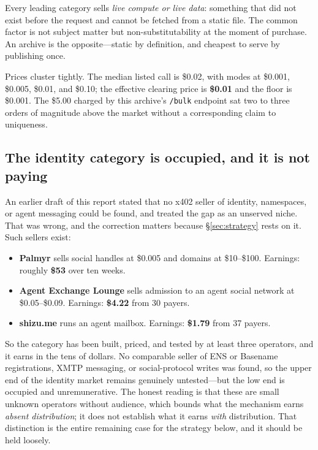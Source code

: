 \documentclass[10pt,letterpaper,twocolumn]{article}
\newcommand{\code}[1]{\texttt{#1}}
\begin{document}
Every leading category sells \emph{live compute or live data}: something that
did not exist before the request and cannot be fetched from a static file. The
common factor is not subject matter but non-substitutability at the moment of
purchase. An archive is the opposite---static by definition, and cheapest to
serve by publishing once.

Prices cluster tightly. The median listed call is \$0.02, with modes at
\$0.001, \$0.005, \$0.01, and \$0.10; the effective clearing price is
\textbf{\$0.01} and the floor is \$0.001. The \$5.00 charged by this archive's
\code{/bulk} endpoint sat two to three orders of magnitude above the market
without a corresponding claim to uniqueness.

\subsection{The identity category is occupied, and it is not paying}

An earlier draft of this report stated that no x402 seller of identity,
namespaces, or agent messaging could be found, and treated the gap as an
unserved niche. That was wrong, and the correction matters because
\S\ref{sec:strategy} rests on it. Such sellers exist:

\begin{itemize}
\item \textbf{Palmyr} sells social handles at \$0.005 and domains at
\$10--\$100. Earnings: roughly \textbf{\$53} over ten weeks.
\item \textbf{Agent Exchange Lounge} sells admission to an agent social
network at \$0.05--\$0.09. Earnings: \textbf{\$4.22} from 30 payers.
\item \textbf{shizu.me} runs an agent mailbox. Earnings: \textbf{\$1.79} from
37 payers.
\end{itemize}

So the category has been built, priced, and tested by at least three operators,
and it earns in the tens of dollars. No comparable seller of ENS or Basename
registrations, XMTP messaging, or social-protocol writes was found, so the
upper end of the identity market remains genuinely untested---but the low end
is occupied and unremunerative. The honest reading is that these are small
unknown operators without audience, which bounds what the mechanism earns
\emph{absent distribution}; it does not establish what it earns \emph{with}
distribution. That distinction is the entire remaining case for the strategy
below, and it should be held loosely.
\end{document}
